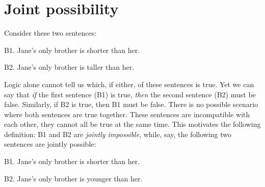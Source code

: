 

\section{Joint possibility}

Consider these two sentences:
	\begin{ebullet}
		\item[B1.] Jane's only brother is shorter than her.
		\item[B2.] Jane's only brother is taller than her.
	\end{ebullet}
Logic alone cannot tell us which, if either, of these sentences is true. Yet we can say that \emph{if} the first sentence (B1) is true, \emph{then} the second sentence (B2) must be false. Similarly, if B2 is true, then B1 must be false. There is no possible scenario where both sentences are true together. These sentences are incompatible with each other, they cannot all be true at the same time. This motivates the following definition:
B1 and B2 are \emph{jointly impossible}, while, say, the following two sentences are jointly possible:
	\begin{ebullet}
		\item[B1.] Jane's only brother is shorter than her.
		\item[B2.] Jane's only brother is younger than her.
	\end{ebullet}

